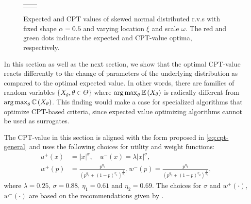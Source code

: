 \begin{figure}
\begin{minipage}{.6\textwidth}
\begin{tabular}{cc}
{{   }
   }
   \end{tabular}
\caption{Expected and CPT values of skewed normal distributed r.v.s with fixed shape $\alpha=0.5$ and varying location $\xi$ and scale $\omega$. The red and green dots indicate the expected and CPT-value optima, respectively.}
\label{fig:skewnormal}
\end{minipage}

\end{figure}

In this section as well as the next section, we show that the optimal CPT-value reacts differently to the change of parameters of the underlying distribution as compared to the optimal expected value. In other words,  there are families of random variables $\{X_\theta, \theta \in \Theta\}$ where $\mathop{\rm arg\,max}_{\theta} \mathbb{E}\left( X_\theta \right)$ is radically different from 
$\mathop{\rm arg\,max}_{\theta} \mathbb{C} \left( X_\theta \right)$. This finding would make a case for specialized algorithms that optimize CPT-based criteria, since expected value optimizing algorithms cannot be used as surrogates. 

The CPT-value in this section is aligned with the form proposed in \eqref{eq:cpt-general} and uses the following choices for utility and weight functions:
\begin{align*}
u^+(x) &=  |x|^{\sigma}, \quad u^-(x) = \lambda |x|^{\sigma},\\
w^+(p) &= \frac{p^{\eta_1}}{{(p^{\eta_1}+ (1-p)^{\eta_1})}^{\frac{1}{\eta_1}}}, w^-(p) = \frac{p^{\eta_2}}{{(p^{\eta_2}+ (1-p)^{\eta_2})}^{\frac{1}{\eta_2}}},
\end{align*} 
where $\lambda = 0.25$, $\sigma = 0.88$, $\eta_1 = 0.61$ and $\eta_2 = 0.69$. The choices for $\sigma$ and $w^+(\cdot)$,  $w^-(\cdot)$ are based on the recommendations given by \cite{tversky1992advances}. 

